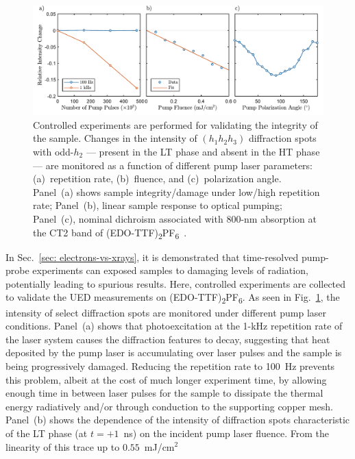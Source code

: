 \begin{figure}[ht!]
  \centering
  \includegraphics[width = \textwidth]{Figures/fig_EDO_control.pdf}
  \caption[UED signal dependence on the pump-laser repetition rate, fluence, and polarization angle.]{
  Controlled experiments are performed for validating the integrity of the sample.
  Changes in the intensity of $(h_1 h_2 h_3)$ diffraction spots with odd-$h_2$
  --- present in the LT phase and absent in the HT phase ---
  are monitored as a function of different pump laser parameters:
  (a)~repetition rate, (b)~fluence, and (c)~polarization angle.
  Panel~(a) shows sample integrity/damage under low/high repetition rate;
  Panel~(b), linear sample response to optical pumping;
  Panel~(c), nominal dichroism associated with 800-nm absorption at the CT2 band of (EDO-TTF)\textsubscript{2}PF\textsubscript{6}~\cite{Drozdova2004}.
  }
  \label{fig: EDO-control}
\end{figure}
%
In Sec.~\ref{sec: electrons-vs-xrays}, it is demonstrated that
time-resolved pump-probe experiments can exposed samples to damaging levels of radiation,
potentially leading to spurious results.
%
Here, controlled experiments are collected to validate
the UED measurements on (EDO-TTF)\textsubscript{2}PF\textsubscript{6}.
As seen in Fig.~\ref{fig: EDO-control}, the intensity of select diffraction spots
are monitored under different pump laser conditions.
Panel~(a) shows that photoexcitation at the 1-kHz repetition rate of the laser system causes
the diffraction features to decay, suggesting that
heat deposited by the pump laser is accumulating over laser pulses and
the sample is being progressively damaged.
%
Reducing the repetition rate to 100~Hz prevents this problem,
albeit at the cost of much longer experiment time,
by allowing enough time in between laser pulses for the sample to dissipate the thermal energy radiatively
and/or through conduction to the supporting copper mesh.
%
Panel~(b) shows the dependence of the intensity of diffraction spots characteristic of the LT phase
(at $t = +1$~ns) on the incident pump laser fluence. From the linearity of this trace up to $0.55$~mJ/cm$^2$
